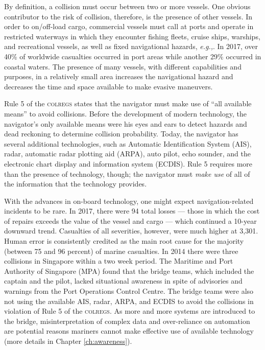 \documentclass[twoside,symmetric,notoc]{tufte-book}
\newcommand{\hairsp}{\hspace{1pt}}
\newcommand{\eg}{\textit{e.\hairsp{}g.,}\hspace{3pt}}
\begin{document}
\par{%
By definition, a collision must occur between two or more vessels.\cite{MAIB} One obvious contributor to the risk of collision, therefore, is the presence of other vessels. In order to on/off-load cargo, commercial vessels must call at ports and operate in restricted waterways in which they encounter fishing fleets, cruise ships, warships, and recreational vessels, as well as fixed navigational hazards, \eg{rocks, bridges, underwater wrecks}. In 2017, over 40\% of worldwide casualties occurred in port areas while another 29\% occurred in coastal waters.\cite[-0.4in]{EMSA} The presence of many vessels, with different capabilities and purposes, in a relatively small area increases the navigational hazard and decreases the time and space available to make evasive maneuvers.\cite[-0.2in]{Aydogdu}\cite{Mou} 
}
\par{%
Rule 5 of the \textsc{colregs} states that the navigator must make use of ``all available means'' to avoid collisions. Before the development of modern technology, the navigator's only available means were his eyes and ears to detect hazards and dead reckoning to determine collision probability.\cite{Gurney} Today, the navigator has several additional technologies, such as Automatic Identification System (AIS), radar, automatic radar plotting aid (ARPA), auto pilot, echo sounder, and the electronic chart display and information system (ECDIS). Rule 5 requires more than the presence of technology, though; the navigator must \textit{make use} of all of the information that the technology provides. 
}
\par{%
With the advances in on-board technology, one might expect navigation-related incidents to be rare. In 2017, there were 94 total losses --- those in which the cost of repairs exceeds the value of the vessel and cargo --- which continued a 10-year downward trend.\cite[-1.2in]{Allianz_2018} Casualties of all severities, however, were much higher at 3,301.\cite[-0.7in]{EMSA} Human error is consistently credited as the main root cause for the majority (between 75 and 96 percent) of marine casualties.\cite[-0.2in]{Veysey} In 2014 there were three collisions in Singapore within a two week period. The Maritime and Port Authority of Singapore (MPA) found that the bridge teams, which included the captain and the pilot, lacked situational awareness in spite of advisories and warnings from the Port Operations Control Centre. The bridge teams were also not using the available AIS, radar, ARPA, and ECDIS to avoid the collisions in violation of Rule 5 of the \textsc{colregs}.\cite{Schuler} As more and more systems are introduced to the bridge, misinterpretation of complex data and over-reliance on automation are potential reasons mariners cannot make effective use of available technology (more details in Chapter \ref{ch:awareness}).\cite{Allianz_2015} 
}
\end{document}
